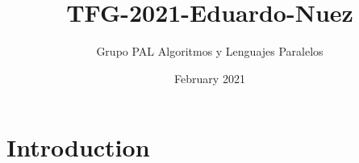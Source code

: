 \documentclass{article}
\title{TFG-2021-Eduardo-Nuez}
\author{Grupo PAL Algoritmos y Lenguajes Paralelos}
\date{February 2021}
\begin{document}
\maketitle

\section{Introduction}
\end{document}

